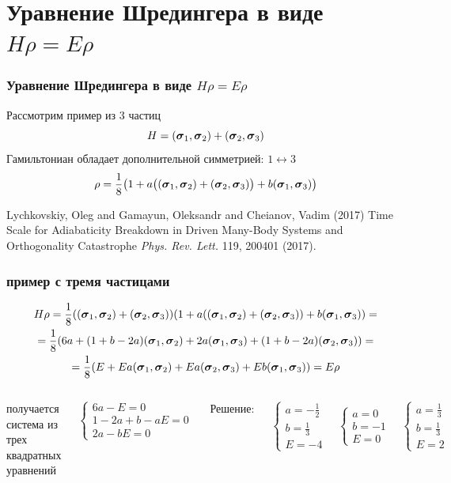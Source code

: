 \documentclass{beamer}
\begin{document}
\section{Уравнение Шредингера в виде $H\rho=E\rho$}
\begin{frame}
\frametitle{Уравнение Шредингера в виде $H\rho=E\rho$ \cite{hroero}}
Рассмотрим пример из 3 частиц
$$H=({\boldsymbol{\sigma}}_1,{\boldsymbol{\sigma}}_2)+({\boldsymbol{\sigma}}_2,{\boldsymbol{\sigma}}_3)$$
Гамильтониан обладает дополнительной симметрией: $1\leftrightarrow 3$
$$\rho = \frac18\big(1+a\big(({\boldsymbol{\sigma}}_1,{\boldsymbol{\sigma}}_2)+({\boldsymbol{\sigma}}_2,{\boldsymbol{\sigma}}_3)\big)+b({\boldsymbol{\sigma}}_1,{\boldsymbol{\sigma}}_3)\big)$$

\footnotesize{
\begin{thebibliography}{99}
 Lychkovskiy, Oleg and Gamayun, Oleksandr and Cheianov, Vadim (2017)
\newblock Time Scale for Adiabaticity Breakdown in Driven Many-Body Systems and Orthogonality Catastrophe
\newblock \emph{Phys. Rev. Lett.} 119, 200401 (2017).
\end{thebibliography}
}


\end{frame}
\begin{frame}
\frametitle{пример с тремя частицами}
\small
$$\begin{gathered}
H\rho=\frac18(({\boldsymbol{\sigma}}_1,{\boldsymbol{\sigma}}_2)+({\boldsymbol{\sigma}}_2,{\boldsymbol{\sigma}}_3)) (1+a(({\boldsymbol{\sigma}}_1,{\boldsymbol{\sigma}}_2)+({\boldsymbol{\sigma}}_2,{\boldsymbol{\sigma}}_3))+b({\boldsymbol{\sigma}}_1,{\boldsymbol{\sigma}}_3)) =\\
= \frac18(6 a +(1+b- 2 a) ({\boldsymbol{\sigma}}_1, {\boldsymbol{\sigma}}_2)  + 2 a ({\boldsymbol{\sigma}}_1, {\boldsymbol{\sigma}}_3) +(1+b- 2 a) ({\boldsymbol{\sigma}}_2, {\boldsymbol{\sigma}}_3)) =\\
= \frac18(E+E a({\boldsymbol{\sigma}}_1,{\boldsymbol{\sigma}}_2)+E a({\boldsymbol{\sigma}}_2,{\boldsymbol{\sigma}}_3) + E b({\boldsymbol{\sigma}}_1,{\boldsymbol{\sigma}}_3)) = E\rho
\end{gathered}$$

\begin{columns}[c] %

получается система из трех квадратных уравнений

$$
\begin{cases}
6 a-E=0\\
1-2 a+b-a E=0\\
2 a-b E=0
\end{cases}
$$

Решение:

$$
\begin{cases}
a=-\frac12 \\b= \frac13 \\E=-4
\end{cases} \quad
\begin{cases}
a=0 \\b=-1 \\E=0
\end{cases} \quad
\begin{cases}
a=\frac13 \\b=\frac13 \\E=2
\end{cases} \quad
$$

\end{columns}
\normalsize
\end{frame}
\end{document}
